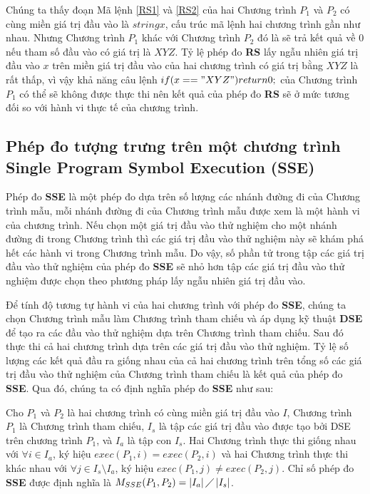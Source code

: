 \begin{minipage}[t]{0.45\linewidth}
	
\end{minipage}%
\hfill\vrule\hfill
\begin{minipage}[t]{0.45\linewidth} 
	
\end{minipage}%
 
Chúng ta thấy đoạn Mã lệnh \ref{RS1} và \ref{RS2} của hai Chương trình $P_{1}$ và $P_{2}$ có cùng miền giá trị đầu vào là $string x$, cấu trúc mã lệnh hai chương trình gần như nhau. Nhưng Chương trình $P_{1}$ khác với Chương trình $P_{2}$ đó là sẽ trả kết quả về $0$ nếu tham số đầu vào có giá trị là $XYZ$. Tỷ lệ phép đo \textbf{RS} lấy ngẫu nhiên giá trị đầu vào $x$ trên miền giá trị đầu vào của hai chương trình có giá trị bằng $XYZ$ là rất thấp, vì vậy khả năng câu lệnh $if (x == "XYZ") return 0;$ của Chương trình $P_{1}$ có thể sẽ không được thực thi nên kết quả của phép đo \textbf{RS} sẽ ở mức tương đối so với hành vi thực tế của chương trình.

\subsection{Phép đo tượng trưng trên một chương trình Single Program Symbol Execution (SSE)}
Phép đo \textbf{SSE} là một phép đo dựa trên số lượng các nhánh đường đi của Chương trình mẫu, mỗi nhánh đường đi của Chương trình mẫu được xem là một hành vi của chương trình. Nếu chọn một giá trị đầu vào thử nghiệm cho một nhánh đường đi trong Chương trình thì các giá trị đầu vào thử nghiệm này sẽ khám phá hết các hành vi trong Chương trình mẫu. Do vậy, số phần tử trong tập các giá trị đầu vào thử nghiệm của phép đo \textbf{SSE} sẽ nhỏ hơn tập các giá trị đầu vào thử nghiệm được chọn theo phương pháp lấy ngẫu nhiên giá trị đầu vào. 

Để tính độ tương tự hành vi của hai chương trình với phép đo \textbf{SSE}, chúng ta chọn Chương trình mẫu làm Chương trình tham chiếu và áp dụng kỹ thuật \textbf{DSE} để tạo ra các đầu vào thử nghiệm dựa trên Chương trình tham chiếu. Sau đó thực thi cả hai chương trình dựa trên các giá trị đầu vào thử nghiệm. Tỷ lệ số lượng các kết quả đầu ra giống nhau của cả hai chương trình trên tổng số các giá trị đầu vào thử nghiệm của Chương trình tham chiếu là kết quả của phép đo \textbf{SSE}. Qua đó, chúng ta có định nghĩa phép đo \textbf{SSE} như sau:

\begin{definition}
	Cho $P_{1}$ và $P_{2}$ là hai chương trình có cùng miền giá trị đầu vào $I$, Chương trình $P_{1}$ là Chương trình tham chiếu, $I_{s}$ là tập các giá trị đầu vào được tạo bởi DSE trên chương trình $P_{1}$, và $I_{a}$ là tập con $I_{s}$. Hai Chương trình thực thi giống nhau với $\forall i \in I_{a}$, ký hiệu $exec(P_{1}, i) = exec(P_{2}, i)$ và hai Chương trình thực thi khác nhau với $\forall j \in I_{s} \setminus I_{a}$, ký hiệu $exec(P_{1}, j) \neq exec(P_{2}, j)$. Chỉ số phép đo \textbf{SSE} được định nghĩa là $M_{SSE}(P_{1}, P_{2}) = \left|I_{a}\right| \diagup \left|I_{s}\right| $.
\end{definition}

